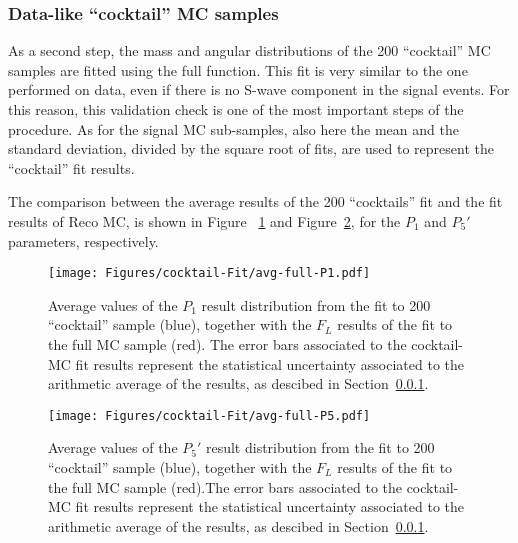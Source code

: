 \subsubsection{Data-like ``cocktail'' MC samples}
\label{sec:Cocktail-MC-full}

As a second step, the mass and angular distributions of the 200 ``cocktail'' MC samples are fitted using the full \pdf function.
This fit is very similar to the one performed on data, even if there is no S-wave component in the signal events.
For this reason, this validation check is one of the most important steps of the procedure.
As for the signal MC sub-samples, also here the mean and the standard deviation, divided by the square root of fits, are used to represent the ``cocktail'' fit results.

The comparison between the average results of the 200 ``cocktails'' fit and the fit results of Reco MC, is shown in Figure ~\ref{fig:closure-full-cocktail-p1} and Figure~\ref{fig:closure-full-cocktail-P5'}, for the $P_1$ and $P_5'$  parameters, respectively.


\begin{figure}[!hbt]
  \centering
  \texttt{[image: Figures/cocktail-Fit/avg-full-P1.pdf]}
  \caption{Average values of the $P_1$ result distribution from the fit to 200 ``cocktail'' sample (blue), together with the $F_L$ results of the fit to the full MC sample (red). The error bars associated to the cocktail-MC fit results represent the statistical uncertainty associated to the arithmetic average of the results, as descibed in Section~\ref{sec:Cocktail-MC-full}.}
  \label{fig:closure-full-cocktail-p1}
\end{figure}

\begin{figure}[!hbt]
  \centering
  \texttt{[image: Figures/cocktail-Fit/avg-full-P5.pdf]}
  \caption{Average values of the $P_5'$ result distribution from the fit to 200 ``cocktail'' sample (blue), together with the $F_L$ results of the fit to the full MC sample (red).The error bars associated to the cocktail-MC fit results represent the statistical uncertainty associated to the arithmetic average of the results, as descibed in Section~\ref{sec:Cocktail-MC-full}.}
  \label{fig:closure-full-cocktail-P5'}
\end{figure}



